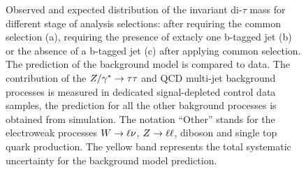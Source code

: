 \begin{figure}[p]
\begin{center}
    \end{center}
     	

    \caption{Observed and expected distribution of the 
	invariant di-$\tau$ mass \mmc for different stage of analysis selections: after requiring the common selection (a),
	requiring the presence of extacly one b-tagged jet (b) or the absence of a b-tagged jet (c) after applying common selection.
	The prediction of the  background model is compared to  data.
        The contribution of the $Z/\gamma^*\rightarrow \tau\tau$ and QCD multi-jet background processes is measured in  dedicated  signal-depleted control data samples,
        the prediction for all the other bakground processes is obtained from simulation.
        The notation ``Other'' stands  for the electroweak processes $W\rightarrow \ell \nu$, $Z\rightarrow \ell \ell$, diboson and single top quark production.
        The yellow band represents the total systematic uncertainty for the background model prediction.}
   \label{fig:mass}
\end{figure}

